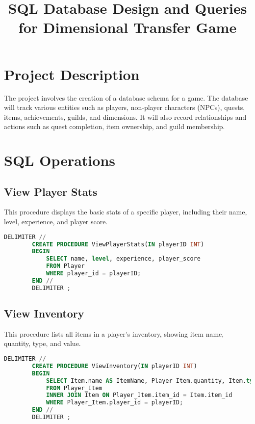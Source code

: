 \documentclass{article}%
\title{SQL Database Design and Queries for Dimensional Transfer Game}%
\author{}%
\begin{document}
%
\normalsize%

%
\maketitle%
\section{Project Description}%
\label{sec:ProjectDescription}%
The project involves the creation of a database schema for a game. The database will track various entities such as players, non{-}player characters (NPCs), quests, items, achievements, guilds, and dimensions. It will also record relationships and actions such as quest completion, item ownership, and guild membership.

%
\section{SQL Operations}%
\label{sec:SQLOperations}%
\subsection{View Player Stats}%
\label{subsec:ViewPlayerStats}%

        This procedure displays the basic stats of a specific player, including their name, level, experience, and player score.
        \begin{lstlisting}[language=sql,caption=View Player Stats]
        DELIMITER //
        CREATE PROCEDURE ViewPlayerStats(IN playerID INT)
        BEGIN
            SELECT name, level, experience, player_score
            FROM Player
            WHERE player_id = playerID;
        END //
        DELIMITER ;
        \end{lstlisting}
        

%
\subsection{View Inventory}%
\label{subsec:ViewInventory}%

        This procedure lists all items in a player's inventory, showing item name, quantity, type, and value.
        \begin{lstlisting}[language=sql,caption=View Inventory]
        DELIMITER //
        CREATE PROCEDURE ViewInventory(IN playerID INT)
        BEGIN
            SELECT Item.name AS ItemName, Player_Item.quantity, Item.type, Item.value
            FROM Player_Item
            INNER JOIN Item ON Player_Item.item_id = Item.item_id
            WHERE Player_Item.player_id = playerID;
        END //
        DELIMITER ;
        \end{lstlisting}
        
\end{document}
